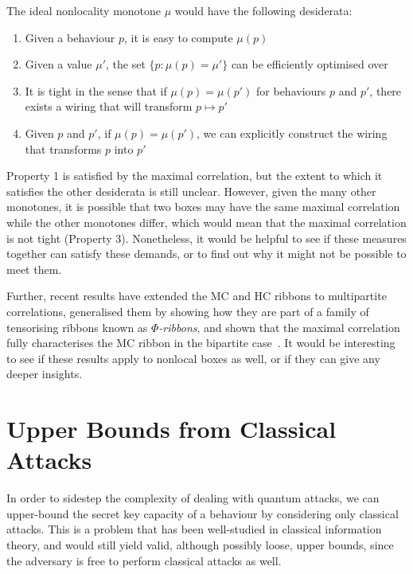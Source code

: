 \documentclass[10pt, a4paper]{article}
\numberwithin{equation}{section} %
\theoremstyle{definition}
\theoremstyle{plain}
\newcommand{\st}{\mathrel{:}} %
\newcommand{\?}{\mathrel{?}} %
\begin{document}
                  The ideal nonlocality monotone \(\mu\) would have the following desiderata:
                  \begin{enumerate}
                    \item Given a behaviour \(p\), it is easy to compute \(\mu(p)\)
                    \item Given a value \(\mu'\), the set \(\{ p \st \mu(p) = \mu' \}\) can be efficiently optimised over
                    \item It is tight in the sense that if \(\mu(p) = \mu(p')\) for behaviours \(p\) and \(p'\), there exists a wiring that will transform \(p \mapsto p'\)
                    \item Given \(p\) and \(p'\), if \(\mu(p) = \mu(p')\), we can explicitly construct the wiring that transforms \(p\) into \(p'\)
                  \end{enumerate}

                  Property 1 is satisfied by the maximal correlation, but the extent to which it satisfies the other desiderata is still unclear. However, given the many other monotones, it is possible that two boxes may have the same maximal correlation while the other monotones differ, which would mean that the maximal correlation is not tight (Property 3). Nonetheless, it would be helpful to see if these measures together can satisfy these demands, or to find out why it might not be possible to meet them.

                  Further, recent results have extended the MC and HC ribbons to multipartite correlations, generalised them by showing how they are part of a family of tensorising ribbons known as \emph{\(\Phi\)-ribbons}, and shown that the maximal correlation fully characterises the MC ribbon in the bipartite case~\cite{PhiEntropies}. It would be interesting to see if these results apply to nonlocal boxes as well, or if they can give any deeper insights.

                  \section{Upper Bounds from Classical Attacks}\label{sec:ubound}

                  In order to sidestep the complexity of dealing with quantum attacks, we can upper-bound the secret key capacity of a behaviour by considering only classical attacks. This is a problem that has been well-studied in classical information theory, and would still yield valid, although possibly loose, upper bounds, since the adversary is free to perform classical attacks as well.
\end{document}
